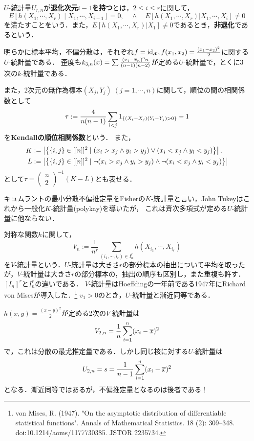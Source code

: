 \documentclass[uplatex,dvipdfmx]{jsreport}
\begin{document}
\begin{definition}
    $U$-統計量$U_{r,n}$が\textbf{退化次元$i-1$を持つ}とは，$2\le i\le r$に関して，
    \[E[h(X_1,\cdots,X_r)\mid X_1,\cdots,X_{i-1}]=0,\quad\land\quad E[h(X_1,\cdots,X_r)|X_1,\cdots,X_i]\ne0\]
    を満たすことをいう．また，$E[h(X_1,\cdots,X_r)|X_1]\ne0$であるとき，\textbf{非退化}であるという．
\end{definition}

\begin{example}
    明らかに標本平均，不偏分散は，それぞれ$f=\mathrm{id}_{\mathcal{X}},f(x_1,x_2)=\frac{(x_1-x_2)^2}{2}$に関する$U$-統計量である．
    歪度も$k_{3,n}(x)=\sum\frac{(x_i-\overline{x}_n)^3n}{(n-1)(n-2)}$が定める$U$-統計量で，とくに3次の$k$-統計量である．

    また，2次元の無作為標本$(X_j,Y_j)\;(j=1,\cdots,n)$に関して，順位の間の相関係数として
    \[\tau:=\frac{4}{n(n-1)}\sum_{i<j}1_{\left\{(X_i-X_j)(Y_i-Y_j)>0\right\}}-1\]
    を\textbf{Kendallの順位相関係数}という．
    また，
    \begin{align*}
        K&:=\left|\left\{\{i,j\}\in[[n]]^2\mid (x_i>x_j\land y_i>y_j)\lor(x_i<x_j\land y_i<y_j)\right\}\right|,\\L&:=\left|\left\{\{i,j\}\in[[n]]^2\mid\lnot(x_i>x_j\land y_i>y_j)\land\lnot(x_i<x_j\land y_i<y_j)\right\}\right|
    \end{align*}
    として$\tau=\begin{pmatrix}n\\2\end{pmatrix}^{-1}(K-L)$とも表せる．
\end{example}

\begin{example}[K-statistic]
    キュムラントの最小分散不偏推定量をFisherの$K$-統計量と言い，John Tukeyはこれから一般化$K$-統計量(polykay)を導いたが，
    これは斉次多項式が定める$U$-統計量に他ならない．
\end{example}

\begin{example}[V-statistic]
    対称な関数$h$に関して，
    \[V_n:=\frac{1}{n^r}\sum_{(i_1,\cdots,i_r)\in I_n^r}h(X_{i_1},\cdots,X_{i_r})\]
    を$V$-統計量という．$U$-統計量は大きさ$r$の部分標本の抽出について平均を取ったが，$V$-統計量は大きさ$r$の部分標本の，抽出の順序も区別し，また重複も許す．$[I_n]^r$と$I_n^r$の違いである．
    $V$-統計量はHoeffdingの一年前である1947年にRichard von Misesが導入した．\footnote{von Mises, R. (1947). "On the asymptotic distribution of differentiable statistical functions". Annals of Mathematical Statistics. 18 (2): 309–348. doi:10.1214/aoms/1177730385. JSTOR 2235734.}
    $v_1>0$のとき，$U$-統計量と漸近同等である．

    $h(x,y)=\frac{(x-y)^2}{2}$が定める2次の$V$-統計量は
    \[V_{2,n}=\frac{1}{n}\sum^n_{i=1}(x_i-\overline{x})^2\]
    で，これは分散の最尤推定量である．しかし同じ核に対する$U$-統計量は
    \[U_{2,n}=s=\frac{1}{n-1}\sum^n_{i=1}(x_i-\overline{x})^2\]
    となる．漸近同等ではあるが，不偏推定量となるのは後者である！
\end{example}
\end{document}
